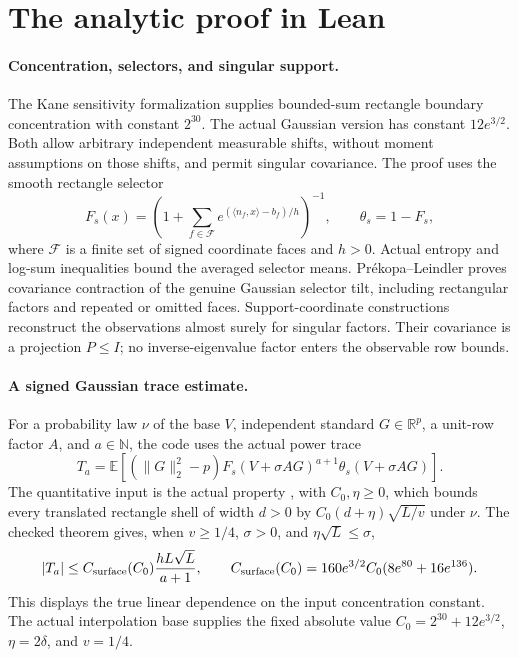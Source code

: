 \documentclass[11pt]{article}
\newcommand{\R}{\mathbb R}
\newcommand{\E}{\mathbb E}
\begin{document}
\section{The analytic proof in Lean}
\paragraph{Concentration, selectors, and singular support.}
The Kane sensitivity formalization supplies bounded-sum rectangle
boundary concentration with constant $2^{30}$. The actual Gaussian
version has constant $12e^{3/2}$. Both allow arbitrary independent
measurable shifts, without moment assumptions on those shifts, and
permit singular covariance. The proof uses the smooth rectangle selector
\[
 F_s(x)=\left(1+\sum_{f\in\mathcal F}
       e^{(\langle n_f,x\rangle-b_f)/h}\right)^{-1},
 \qquad \theta_s=1-F_s,
\]
where $\mathcal F$ is a finite set of signed coordinate faces and $h>0$.
Actual entropy and log-sum inequalities bound the averaged selector means.
Pr\'ekopa--Leindler proves covariance contraction of the genuine Gaussian
selector tilt, including rectangular factors and repeated or omitted
faces. Support-coordinate constructions reconstruct the observations
almost surely for singular factors. Their covariance is a projection
$P\le I$; no inverse-eigenvalue factor enters the observable row bounds.

\paragraph{A signed Gaussian trace estimate.}
For a probability law $\nu$ of the base $V$, independent standard
$G\in\R^p$, a unit-row factor $A$, and $a\in\mathbb N$, the code uses
the actual power trace
\[
 T_a=\E\left[(\|G\|_2^2-p)
   F_s(V+\sigma AG)^{a+1}\theta_s(V+\sigma AG)\right].
\]
The quantitative input is the actual property
, with $C_0,\eta\ge0$, which bounds every translated
rectangle shell of width $d>0$ by
$C_0(d+\eta)\sqrt{L/v}$ under $\nu$. The checked theorem
 gives, when
$v\ge1/4$, $\sigma>0$, and $\eta\sqrt L\le\sigma$,
\begin{equation}
 |T_a|\le
 C_{\rm surface}(C_0)\frac{hL\sqrt L}{a+1},\qquad
 C_{\rm surface}(C_0)=160e^{3/2}C_0(8e^{80}+16e^{136}).
 \label{eq:surface}
\end{equation}
This displays the true linear dependence on the input concentration
constant. The actual interpolation base supplies the fixed absolute
value $C_0=2^{30}+12e^{3/2}$, $\eta=2\delta$, and $v=1/4$.
\end{document}
